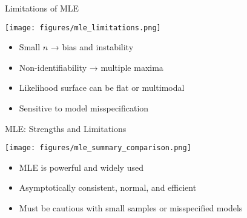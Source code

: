 \begin{frame}{Limitations of MLE}
  \footnotesize
  \begin{center}
    \texttt{[image: figures/mle\_limitations.png]}
  \end{center}
  \vspace{-0.7em}
  \begin{itemize}
    \footnotesize
    \item Small \(n\) → bias and instability
    \item Non-identifiability → multiple maxima
    \item Likelihood surface can be flat or multimodal
    \item Sensitive to model misspecification
  \end{itemize}
\end{frame}

\begin{frame}{MLE: Strengths and Limitations}
  \footnotesize
  \begin{center}
    \texttt{[image: figures/mle\_summary\_comparison.png]}
  \end{center}
  \vspace{-0.8em}
  \begin{itemize}
    \footnotesize
    \item MLE is powerful and widely used
    \item Asymptotically consistent, normal, and efficient
    \item Must be cautious with small samples or misspecified models
  \end{itemize}
\end{frame}
